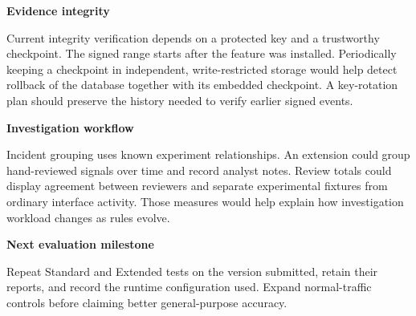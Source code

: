 \documentclass[11pt,a4paper,oneside]{report}
\newcommand{\topic}[1]{\smallskip\noindent\textbf{#1}\par\nobreak\vspace{-.39em}}
\begin{document}
\topic{Evidence integrity}
Current integrity verification depends on a protected key and a trustworthy checkpoint. The signed range starts after the feature was installed. Periodically keeping a checkpoint in independent, write-restricted storage would help detect rollback of the database together with its embedded checkpoint. A key-rotation plan should preserve the history needed to verify earlier signed events.

\topic{Investigation workflow}
Incident grouping uses known experiment relationships. An extension could group hand-reviewed signals over time and record analyst notes. Review totals could display agreement between reviewers and separate experimental fixtures from ordinary interface activity. Those measures would help explain how investigation workload changes as rules evolve.

\topic{Next evaluation milestone}
Repeat Standard and Extended tests on the version submitted, retain their reports, and record the runtime configuration used. Expand normal-traffic controls before claiming better general-purpose accuracy.
\end{document}
